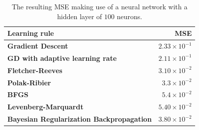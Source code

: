 \documentclass[a4paper,10pt]{article}
\begin{document}
\begin{table}
	\centering
	\begin{tabular}{@{}lr@{}} \toprule
		\textbf{Learning rule}  &  MSE \\\midrule
		\textbf{Gradient Descent}  &  $ 2.33\times10^{-1} $ \\
		\textbf{GD with adaptive learning rate}  & $ 2.11\times10^{-1} $  \\
		\textbf{Fletcher-Reeves}  & $ 3.10\times10^{-2} $ \\
		\textbf{Polak-Ribier}  & $ 3.3\times10^{-2} $  \\
		\textbf{BFGS}  &  $ 5.4\times10^{-2} $\\
		\textbf{Levenberg-Marquardt}  &  $ 5.40\times10^{-2} $\\ 
		\textbf{Bayesian Regularization Backpropagation}  & $ 3.80\times10^{-2} $ \\ \bottomrule
	\end{tabular}
	\caption{The resulting MSE making use of a neural network with a hidden layer of $ 100 $ neurons.}
	\label{tab:over_para}
\end{table}



%
\end{document}

